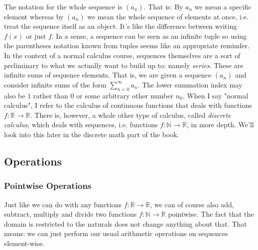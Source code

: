 \medskip
The notation for the whole sequence is $(a_n)$. That is: By $a_n$ we mean a specific element whereas by $(a_n)$ we mean the whole sequence of elements at once, i.e. treat the sequence itself as an object. It's like the difference between writing $f(x)$ or just $f$. In a sense, a sequence can be seen as an infinite tuple so using the parentheses notation known from tuples seems like an appropriate reminder. In the context of a normal calculus course, sequences themselves are a sort of preliminary to what we actually want to build up to: namely \emph{series}. These are infinite sums of sequence elements. That is, we are given a sequence $(a_n)$ and consider infinite sums of the form $\sum_{n=0}^{\infty} a_n$. The lower summation index may also be $1$ rather than $0$ or some arbitrary other number $n_0$. When I say "normal calculus", I refer to the calculus of continuous functions that deals with functions $f: \mathbb{R} \rightarrow \mathbb{R}$. There is, however, a whole other type of calculus, called \emph{discrete calculus}, which deals with sequences, i.e. functions $f: \mathbb{N} \rightarrow \mathbb{R}$, in more depth. We'll look into this later in the discrete math part of the book.






\subsection{Operations}

\subsubsection{Pointwise Operations}
Just like we can do with any functions $f: \mathbb{R} \rightarrow \mathbb{R}$, we can of course also add, subtract, multiply and divide two functions $f: \mathbb{N} \rightarrow \mathbb{R}$ pointwise. The fact that the domain is restricted to the naturals does not change anything about that. That means: we can just perform our usual arithmetic operations on sequences element-wise.

